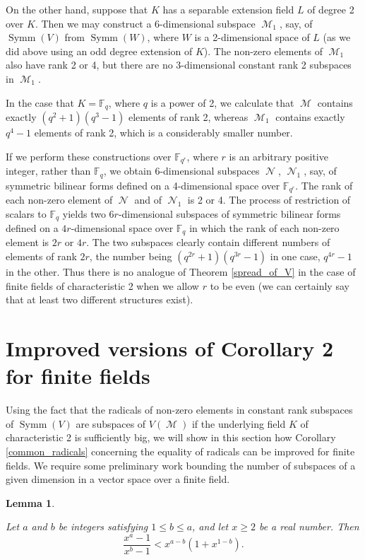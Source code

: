\documentclass{amsart}
\DeclareMathOperator{\M}{\mathcal{M}}
\DeclareMathOperator{\N}{\mathcal{N}}
\DeclareMathOperator{\Symm}{Symm}
\theoremstyle{plain}
\newtheorem{lemma}{Lemma}
\theoremstyle{definition}
\begin{document}
On the other hand, suppose that $K$ has a separable extension field $L$ of degree 2 over $K$. Then we may construct a 6-dimensional
subspace $\M_1$, say, of $\Symm(V)$ from $\Symm(W)$, where $W$ is a 2-dimensional space of $L$ (as we did above using an odd degree extension
of $K$). The non-zero elements of $\M_1$ also have rank 2 or 4, but there are no 3-dimensional constant rank 2 subspaces in $\M_1$.

In the case that $K=\mathbb{F}_q$, where $q$ is a power of 2, we calculate that $\M$ contains exactly $(q^2+1)(q^3-1)$ elements of rank 2,
whereas $\M_1$ contains exactly $q^4-1$ elements of rank 2, which is a considerably smaller number.

If we perform these constructions over $\mathbb{F}_{q^r}$, where $r$ is an arbitrary positive integer, rather than $\mathbb{F}_q$, 
we obtain 6-dimensional subspaces $\N$, $\N_1$, say, of symmetric bilinear forms defined on a 4-dimensional space over
$\mathbb{F}_{q^r}$. The rank of each non-zero element of
$\N$ and of $\N_1$ is 2 or 4. The process of restriction of scalars to $\mathbb{F}_{q}$ yields two $6r$-dimensional subspaces of symmetric bilinear
forms defined on a $4r$-dimensional space over $\mathbb{F}_{q}$ in which the rank of each non-zero element is $2r$ or $4r$.
The two subspaces clearly contain different numbers of elements of rank $2r$, the number being $(q^{2r}+1)(q^{3r}-1)$ in one case,
$q^{4r}-1$ in the other. Thus there is no analogue of Theorem \ref{spread_of_V} in the case of finite fields of characteristic 2 
when we allow $r$ to be even
(we can certainly say that at least two different structures exist).


\section{Improved versions of Corollary 2 for finite fields}

\noindent Using the fact that the radicals of non-zero elements in constant rank subspaces of $\Symm(V)$ are subspaces of $V(\M)$ if the underlying
field $K$ of characteristic 2 is sufficiently big, we will show in this section how  Corollary \ref{common_radicals} concerning the equality of radicals can be improved
for finite fields. We require some preliminary work bounding the number of subspaces of a given dimension in a vector space over a finite field.

\begin{lemma} \label{elementary_inequality}
 
 Let $a$ and $b$ be integers satisfying $1\leq b\leq a$, and let $x\geq 2$ be a real number. Then
 \[
  \frac{x^a-1}{x^b-1}<x^{a-b}(1+x^{1-b}).
 \]

 
\end{lemma}
\end{document}
